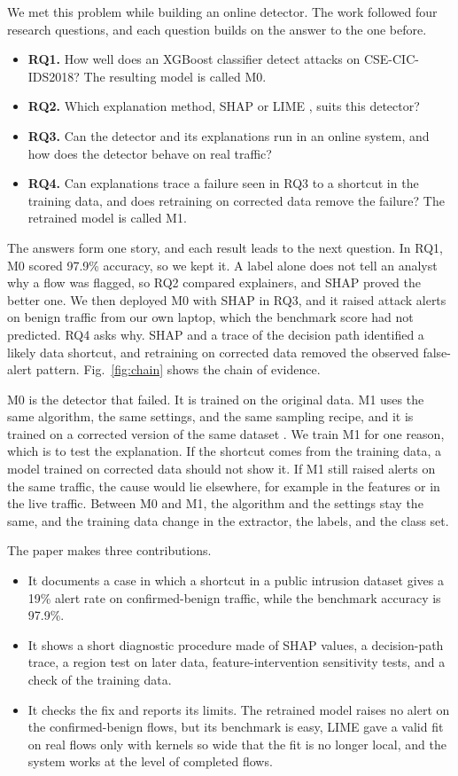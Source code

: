 \documentclass[conference]{IEEEtran}
\begin{document}
We met this problem while building an online detector. The work followed four research questions, and each question builds on the answer to the one before.
\begin{itemize}
\item \textbf{RQ1.} How well does an XGBoost classifier \cite{chen2016} detect attacks on CSE-CIC-IDS2018? The resulting model is called M0.
\item \textbf{RQ2.} Which explanation method, SHAP \cite{lundberg2017,lundberg2020} or LIME \cite{ribeiro2016}, suits this detector?
\item \textbf{RQ3.} Can the detector and its explanations run in an online system, and how does the detector behave on real traffic?
\item \textbf{RQ4.} Can explanations trace a failure seen in RQ3 to a shortcut in the training data, and does retraining on corrected data remove the failure? The retrained model is called M1.
\end{itemize}

The answers form one story, and each result leads to the next question. In RQ1, M0 scored 97.9\% accuracy, so we kept it. A label alone does not tell an analyst why a flow was flagged, so RQ2 compared explainers, and SHAP proved the better one. We then deployed M0 with SHAP in RQ3, and it raised attack alerts on benign traffic from our own laptop, which the benchmark score had not predicted. RQ4 asks why. SHAP and a trace of the decision path identified a likely data shortcut, and retraining on corrected data removed the observed false-alert pattern. Fig.~\ref{fig:chain} shows the chain of evidence.

M0 is the detector that failed. It is trained on the original data. M1 uses the same algorithm, the same settings, and the same sampling recipe, and it is trained on a corrected version of the same dataset \cite{liu2022}. We train M1 for one reason, which is to test the explanation. If the shortcut comes from the training data, a model trained on corrected data should not show it. If M1 still raised alerts on the same traffic, the cause would lie elsewhere, for example in the features or in the live traffic. Between M0 and M1, the algorithm and the settings stay the same, and the training data change in the extractor, the labels, and the class set.

The paper makes three contributions.
\begin{itemize}
\item It documents a case in which a shortcut in a public intrusion dataset gives a 19\% alert rate on confirmed-benign traffic, while the benchmark accuracy is 97.9\%.
\item It shows a short diagnostic procedure made of SHAP values, a decision-path trace, a region test on later data, feature-intervention sensitivity tests, and a check of the training data.
\item It checks the fix and reports its limits. The retrained model raises no alert on the confirmed-benign flows, but its benchmark is easy, LIME gave a valid fit on real flows only with kernels so wide that the fit is no longer local, and the system works at the level of completed flows.
\end{itemize}
\end{document}
